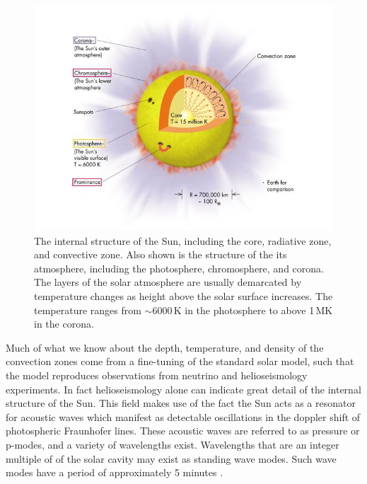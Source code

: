\begin{figure}[!t]
\begin{center}
\includegraphics[trim = 0cm 0.5cm 0cm 0cm, width=1.0\textwidth]{images/solar_atmosphere}
\caption{The internal structure of the Sun, including the core, radiative zone, and convective zone.  Also shown is the structure of the its atmosphere, including the photosphere, chromosphere, and corona. The layers of the solar atmosphere are usually demarcated by temperature changes as height above the solar surface increases. The temperature ranges from $\sim$6000\,K in the photosphere to above 1\,MK in the corona.}
\label{fig:solar_atmosphere} 
\end{center}
\end{figure}


Much of what we know about the depth, temperature, and density of the convection zones come from a fine-tuning of the standard solar model, such that the model reproduces observations from neutrino and helioseismology experiments. In fact helioseismology alone can indicate great detail of the internal structure of the Sun. This field makes use of the fact the Sun acts as a resonator for acoustic waves which manifest as detectable oscillations in the doppler shift of photospheric Fraunhofer lines. These acoustic waves are referred to as pressure or p-modes, and a variety of wavelengths exist. Wavelengths that are an integer multiple of of the solar cavity may exist as standing wave modes. Such wave modes have a period of approximately 5 minutes \citep{turk2011}. 

